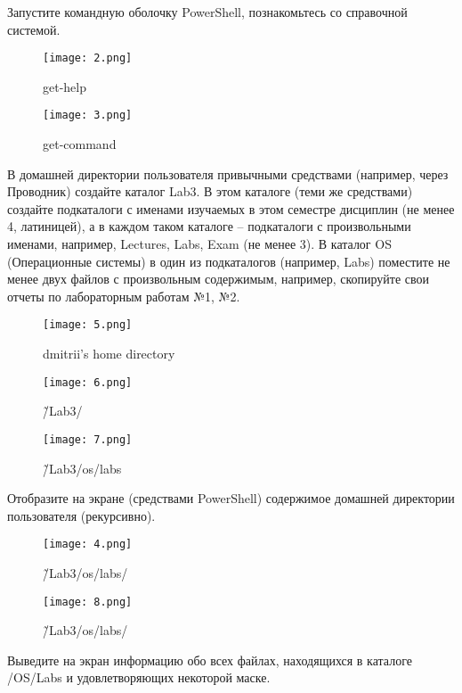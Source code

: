 \documentclass[a4paper]{article}
\begin{document}
Запустите командную оболочку PowerShell, познакомьтесь со справочной системой.
\begin{figure}[H]
    \centering
    \texttt{[image: 2.png]}
    \caption{get-help}
\end{figure}

\begin{figure}[H]
    \centering
    \texttt{[image: 3.png]}
    \caption{get-command}
\end{figure}

В домашней директории пользователя привычными средствами (например, через Проводник) создайте каталог Lab3. В этом каталоге (теми же средствами) создайте подкаталоги с именами изучаемых в этом семестре дисциплин (не менее 4, латиницей), а в каждом таком каталоге – подкаталоги с произвольными именами, например, Lectures, Labs, Exam (не менее 3). В каталог OS (Операционные системы) в один из подкаталогов (например, Labs) поместите не менее двух файлов с произвольным содержимым, например, скопируйте свои отчеты по лабораторным работам №1, №2.

\begin{figure}[H]
    \centering
    \texttt{[image: 5.png]}
    \caption{dmitrii's home directory}
\end{figure}

\begin{figure}[H]
    \centering
    \texttt{[image: 6.png]}
    \caption{\~/Lab3/}
\end{figure}


\begin{figure}[H]
    \centering
    \texttt{[image: 7.png]}
    \caption{\~/Lab3/os/labs}
\end{figure}

Отобразите на экране (средствами PowerShell) содержимое домашней директории пользователя (рекурсивно).

\begin{figure}[H]
    \centering
    \texttt{[image: 4.png]}
    \caption{\~/Lab3/os/labs/}
\end{figure}


\begin{figure}[H]
    \centering
    \texttt{[image: 8.png]}
    \caption{\~/Lab3/os/labs/}
\end{figure}

Выведите на экран информацию обо всех файлах, находящихся в каталоге /OS/Labs и удовлетворяющих некоторой маске.
\end{document}
